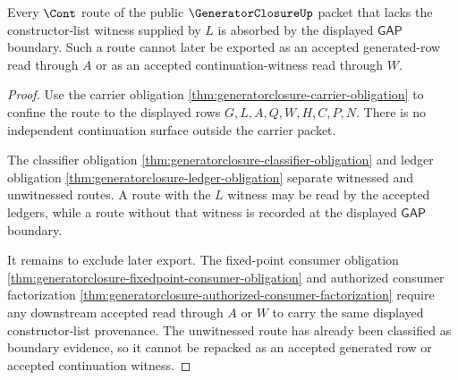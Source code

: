 \begin{theorem}
\label{thm:generatorclosure-gap-boundary-absorbs-unwitnessed-route}
Every $\Cont$ route of the public $\GeneratorClosureUp$ packet that lacks the constructor-list witness supplied by $L$ is absorbed by the displayed $\mathsf{GAP}$ boundary. Such a route cannot later be exported as an accepted generated-row read through $A$ or as an accepted continuation-witness read through $W$.
\end{theorem}
\begin{proof}
Use the carrier obligation \autoref{thm:generatorclosure-carrier-obligation} to confine the route to the displayed rows $G,L,A,Q,W,H,C,P,N$. There is no independent continuation surface outside the carrier packet.

The classifier obligation \autoref{thm:generatorclosure-classifier-obligation} and ledger obligation \autoref{thm:generatorclosure-ledger-obligation} separate witnessed and unwitnessed routes. A route with the $L$ witness may be read by the accepted ledgers, while a route without that witness is recorded at the displayed $\mathsf{GAP}$ boundary.

It remains to exclude later export. The fixed-point consumer obligation \autoref{thm:generatorclosure-fixedpoint-consumer-obligation} and authorized consumer factorization \autoref{thm:generatorclosure-authorized-consumer-factorization} require any downstream accepted read through $A$ or $W$ to carry the same displayed constructor-list provenance. The unwitnessed route has already been classified as boundary evidence, so it cannot be repacked as an accepted generated row or accepted continuation witness.
\end{proof}

